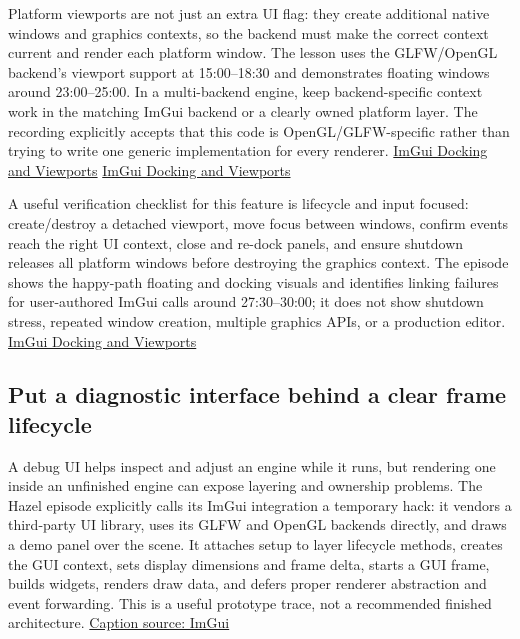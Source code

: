 Platform viewports are not just an extra UI flag: they create additional native windows and graphics contexts, so the backend must make the correct context current and render each platform window. The lesson uses the GLFW/OpenGL backend's viewport support at 15:00--18:30 and demonstrates floating windows around 23:00--25:00. In a multi-backend engine, keep backend-specific context work in the matching ImGui backend or a clearly owned platform layer. The recording explicitly accepts that this code is OpenGL/GLFW-specific rather than trying to write one generic implementation for every renderer. \href{https://www.youtube.com/watch?v=lZuje-3iyVE&t=900s}{ImGui Docking and Viewports} \href{https://www.youtube.com/watch?v=lZuje-3iyVE&t=1380s}{ImGui Docking and Viewports}

A useful verification checklist for this feature is lifecycle and input focused: create/destroy a detached viewport, move focus between windows, confirm events reach the right UI context, close and re-dock panels, and ensure shutdown releases all platform windows before destroying the graphics context. The episode shows the happy-path floating and docking visuals and identifies linking failures for user-authored ImGui calls around 27:30--30:00; it does not show shutdown stress, repeated window creation, multiple graphics APIs, or a production editor. \href{https://www.youtube.com/watch?v=lZuje-3iyVE&t=1650s}{ImGui Docking and Viewports}

\subsection{Put a diagnostic interface behind a clear frame lifecycle}\label{06-engine-ii-ch032-put-a-diagnostic-interface-behind-a-clear-frame-lifecycle}

A debug UI helps inspect and adjust an engine while it runs, but rendering one inside an unfinished engine can expose layering and ownership problems. The Hazel episode explicitly calls its ImGui integration a temporary hack: it vendors a third-party UI library, uses its GLFW and OpenGL backends directly, and draws a demo panel over the scene. It attaches setup to layer lifecycle methods, creates the GUI context, sets display dimensions and frame delta, starts a GUI frame, builds widgets, renders draw data, and defers proper renderer abstraction and event forwarding. This is a useful prototype trace, not a recommended finished architecture. \href{https://www.youtube.com/watch?v=st4lgNI6_F4}{Caption source: ImGui}

